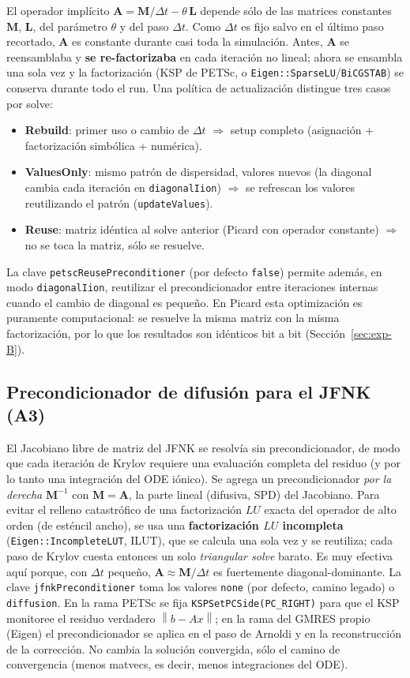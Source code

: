 \documentclass[11pt,a4paper]{article}
\newcommand{\code}[1]{\texttt{\small #1}}
\newcommand{\Mmass}{\mathbf{M}}
\newcommand{\Lop}{\mathbf{L}}
\newcommand{\Aimp}{\mathbf{A}}
\newcommand{\norm}[1]{\left\lVert #1 \right\rVert}
\newcommand{\dictkey}[1]{\textcolor{black!60!green}{\texttt{\footnotesize #1}}}
\begin{document}
El operador implícito $\Aimp = \Mmass/\Delta t - \theta\,\Lop$ depende sólo de las
matrices constantes $\Mmass$, $\Lop$, del parámetro $\theta$ y del paso $\Delta t$.
Como $\Delta t$ es fijo salvo en el último paso recortado, $\Aimp$ es constante
durante casi toda la simulación. Antes, $\Aimp$ se reensamblaba y \textbf{se
re-factorizaba} en cada iteración no lineal; ahora se ensambla una sola vez y la
factorización (KSP de PETSc, o \code{Eigen::SparseLU}/\code{BiCGSTAB}) se conserva
durante todo el run. Una política de actualización distingue tres casos por solve:
\begin{itemize}[nosep]
  \item \textbf{Rebuild}: primer uso o cambio de $\Delta t$ $\Rightarrow$ setup
        completo (asignación + factorización simbólica + numérica).
  \item \textbf{ValuesOnly}: mismo patrón de dispersidad, valores nuevos (la
        diagonal cambia cada iteración en \dictkey{diagonalIion}) $\Rightarrow$ se
        refrescan los valores reutilizando el patrón (\code{updateValues}).
  \item \textbf{Reuse}: matriz idéntica al solve anterior (Picard con operador
        constante) $\Rightarrow$ no se toca la matriz, sólo se resuelve.
\end{itemize}
La clave \dictkey{petscReusePreconditioner} (por defecto \code{false}) permite
además, en modo \dictkey{diagonalIion}, reutilizar el precondicionador entre
iteraciones internas cuando el cambio de diagonal es pequeño. En Picard esta
optimización es puramente computacional: se resuelve la misma matriz con la misma
factorización, por lo que los resultados son idénticos bit a bit
(Sección~\ref{sec:exp-B}).

\subsection{Precondicionador de difusión para el JFNK (A3)}
\label{sec:optim-A3}

El Jacobiano libre de matriz del JFNK se resolvía sin precondicionador, de modo que
cada iteración de Krylov requiere una evaluación completa del residuo (y por lo
tanto una integración del ODE iónico). Se agrega un precondicionador \emph{por la
derecha} $\mathbf{M}^{-1}$ con $\mathbf{M}=\Aimp$, la parte lineal (difusiva, SPD)
del Jacobiano. Para evitar el relleno catastrófico de una factorización $LU$ exacta
del operador de alto orden (de esténcil ancho), se usa una \textbf{factorización
$LU$ incompleta} (\code{Eigen::IncompleteLUT}, ILUT), que se calcula una sola vez y
se reutiliza; cada paso de Krylov cuesta entonces un solo \emph{triangular solve}
barato. Es muy efectiva aquí porque, con $\Delta t$ pequeño, $\Aimp\approx
\Mmass/\Delta t$ es fuertemente diagonal-dominante. La clave
\dictkey{jfnkPreconditioner} toma los valores \code{none} (por defecto, camino
legado) o \code{diffusion}. En la rama PETSc se fija \code{KSPSetPCSide(PC\_RIGHT)}
para que el KSP monitoree el residuo verdadero $\norm{b - Ax}$; en la rama
del GMRES propio (Eigen) el precondicionador se aplica en el paso de Arnoldi y en
la reconstrucción de la corrección. No cambia la solución convergida, sólo el
camino de convergencia (menos matvecs, es decir, menos integraciones del ODE).
\end{document}
